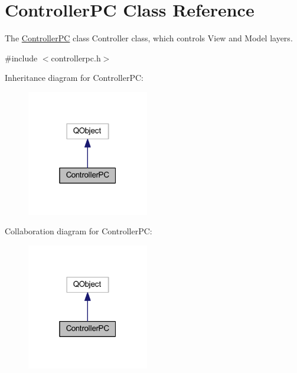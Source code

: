 \hypertarget{class_controller_p_c}{}\section{Controller\+PC Class Reference}
\label{class_controller_p_c}


The \mbox{\hyperlink{class_controller_p_c}{Controller\+PC}} class Controller class, which controls View and Model layers.  




{\ttfamily \#include $<$controllerpc.\+h$>$}



Inheritance diagram for Controller\+PC\+:
\nopagebreak
\begin{figure}[H]
\begin{center}
\leavevmode
\includegraphics[width=151pt]{class_controller_p_c__inherit__graph}
\end{center}
\end{figure}


Collaboration diagram for Controller\+PC\+:
\nopagebreak
\begin{figure}[H]
\begin{center}
\leavevmode
\includegraphics[width=151pt]{class_controller_p_c__coll__graph}
\end{center}
\end{figure}
